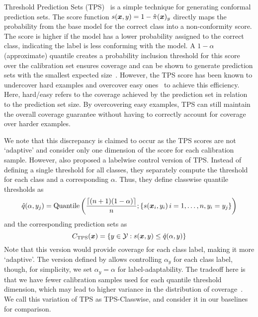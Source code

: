 Threshold Prediction Sets (TPS)~\citep{sadinle2019least} is a simple technique for generating conformal prediction sets.
The score function $s({\bm{x}}, y) = 1 - \hat{\pi}({\bm{x}})_y$ directly maps the probability from the base model for the correct class into a non-conformity score.
The score is higher if the model has a lower probability assigned to the correct class, indicating the label is less conforming with the model.
A $1-\alpha$ (approximate) quantile creates a probability inclusion threshold for this score over the calibration set ensures coverage and can be shown to generate prediction sets with the smallest expected size~\cite{sadinle2019least}.
However, the TPS score has been known to undercover hard examples and overcover easy ones~\citep{angelopoulos2021uncertainty,zargarbashi23conformal} to achieve this efficiency.
Here, hard/easy refers to the coverage achieved by the prediction set in relation to the prediction set size.
By overcovering easy examples, TPS can still maintain the overall coverage guarantee without having to correctly account for coverage over harder examples.

We note that this discrepancy is claimed to occur as the TPS scores are not `adaptive' and consider only one dimension of the score for each calibration sample.
However, \citet{sadinle2019least} also proposed a labelwise control version of TPS.
Instead of defining a single threshold for all classes, they separately compute the threshold for each class and a corresponding $\alpha$.
Thus, they define classwise quantile thresholds as
\[
    \hat{q}(\alpha, y_j) = \text{Quantile}\left(\frac{\lceil(n+1)(1-\alpha)\rceil}{n}; \{s({\bm{x}}_i, y_i)\, {i=1, \dots, n, y_i = y_j}\}\right)
\]
and the corresponding prediction sets as
\[
    C_{\text{TPS}}({\bm{x}}) = \{y \in {\mathcal{Y}}: s({\bm{x}}, y) \leq \hat{q}(\alpha, y)\}
\]
Note that this version would provide coverage for each class label, making it more `adaptive'.
The version defined by \citet{sadinle2019least} allows controlling $\alpha_y$ for each class label, though, for simplicity, we set $\alpha_y = \alpha$ for label-adaptability.
The tradeoff here is that we have fewer calibration samples used for each quantile threshold dimension, which may lead to higher variance in the distribution of coverage~\cite{vovk2012conditional}.
We call this variation of TPS as TPS-Classwise, and consider it in our baselines for comparison.